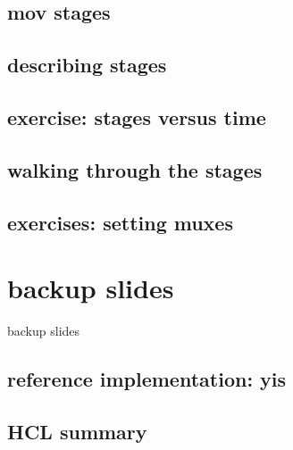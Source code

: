 \subsection{mov stages}



\subsection{describing stages}



\subsection{exercise: stages versus time}



\subsection{walking through the stages}



\subsection{exercises: setting muxes}


\section{backup slides}
\begin{frame}{backup slides}
\end{frame}

\subsection{reference implementation: yis}


\subsection{HCL summary}


